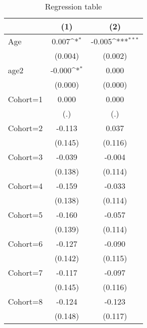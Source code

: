 \begin{table}[htbp]\centering
\def\sym#1{\ifmmode^{#1}\else\(^{#1}\)\fi}
\caption{Regression table \label{reg3}}
\begin{tabular}{l*{2}{c}}
\toprule
                    &\multicolumn{1}{c}{(1)}         &\multicolumn{1}{c}{(2)}         \\
\midrule
Age                 &       0.007\sym{*}  &      -0.005\sym{***}\\
                    &     (0.004)         &     (0.002)         \\
\addlinespace
age2                &      -0.000\sym{*}  &       0.000         \\
                    &     (0.000)         &     (0.000)         \\
\addlinespace
Cohort=1            &       0.000         &       0.000         \\
                    &         (.)         &         (.)         \\
\addlinespace
Cohort=2            &      -0.113         &       0.037         \\
                    &     (0.145)         &     (0.116)         \\
\addlinespace
Cohort=3            &      -0.039         &      -0.004         \\
                    &     (0.138)         &     (0.114)         \\
\addlinespace
Cohort=4            &      -0.159         &      -0.033         \\
                    &     (0.138)         &     (0.114)         \\
\addlinespace
Cohort=5            &      -0.160         &      -0.057         \\
                    &     (0.139)         &     (0.114)         \\
\addlinespace
Cohort=6            &      -0.127         &      -0.090         \\
                    &     (0.142)         &     (0.115)         \\
\addlinespace
Cohort=7            &      -0.117         &      -0.097         \\
                    &     (0.145)         &     (0.116)         \\
\addlinespace
Cohort=8            &      -0.124         &      -0.123         \\
                    &     (0.148)         &     (0.117)         \\

\end{tabular}
\end{table}
